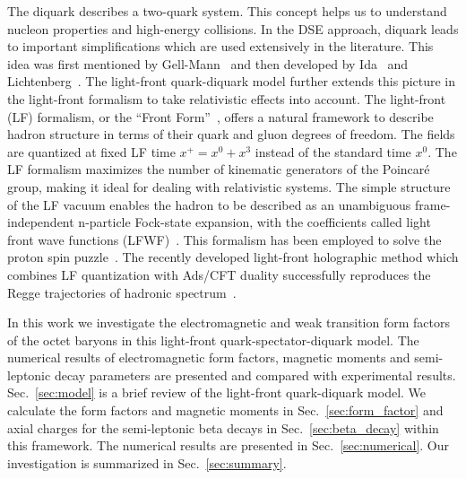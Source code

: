\documentclass[aps,prc,preprint,groupedaddress,showpacs,superscriptaddress,floatfix]{revtex4-1}
\begin{document}
The diquark describes a two-quark system.
This concept helps us to understand nucleon properties and high-energy collisions.
In the DSE approach, diquark leads to important simplifications which are used extensively in the literature.
This idea was first mentioned by Gell-Mann~\cite{gell-mann_schematic_1964} and then developed by Ida~\cite{ida_baryon_1966} and Lichtenberg~\cite{lichtenberg_baryon_1967}.
The light-front quark-diquark model further extends this picture in the light-front formalism to take relativistic effects into account.
The light-front (LF) formalism, or the ``Front Form''~\cite{dirac_forms_1949}, offers a natural framework to describe hadron structure in terms of their quark and gluon degrees of freedom.
The fields are quantized at fixed LF time $x^+=x^0+x^3$ instead of the standard time $x^0$.
The LF formalism maximizes the number of kinematic generators of the Poincar\'e group, making it ideal for dealing with relativistic systems.
The simple structure of the LF vacuum enables the hadron to be described as an unambiguous frame-independent n-particle Fock-state expansion, with the coefficients called light front wave functions (LFWF)~\cite{brodsky_quantum_1998}.
This formalism has been employed to solve the proton spin puzzle~\cite{ma_melosh_1991,*ma_proton_1993}.
The recently developed light-front holographic method which combines LF quantization with Ads/CFT duality successfully reproduces the Regge trajectories of hadronic spectrum~\cite{karch_linear_2006,brodsky_ads/cft_2008}.

In this work we investigate the electromagnetic and weak transition form factors of the octet baryons in this light-front quark-spectator-diquark model.
The numerical results of electromagnetic form factors, magnetic moments and semi-leptonic decay parameters are presented and compared with experimental results.
Sec.~\ref{sec:model} is a brief review of the light-front quark-diquark model.
We calculate the form factors and magnetic moments in Sec.~\ref{sec:form_factor} and axial charges for the semi-leptonic beta decays in Sec.~\ref{sec:beta_decay} within this framework.
The numerical results are presented in Sec.~\ref{sec:numerical}.
Our investigation is summarized in Sec.~\ref{sec:summary}.
\end{document}
